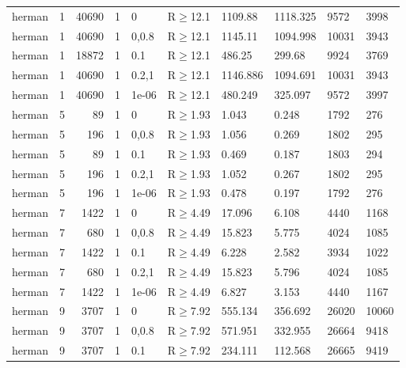 \begin{longtable}{llrrllllll}
 herman        & 1         &  	40690 &   1 & 0     & R$\geq$12.1  & 1109.88  & 1118.325 & 9572    & 3998   \\
 herman        & 1         &  	40690 &   1 & 0,0.8 & R$\geq$12.1  & 1145.11  & 1094.998 & 10031   & 3943   \\
 herman        & 1         &  	18872 &   1 & 0.1   & R$\geq$12.1  & 486.25   & 299.68   & 9924    & 3769   \\
 herman        & 1         &  	40690 &   1 & 0.2,1 & R$\geq$12.1  & 1146.886 & 1094.691 & 10031   & 3943   \\
 herman        & 1         &  	40690 &   1 & 1e-06 & R$\geq$12.1  & 480.249  & 325.097  & 9572    & 3997   \\
 herman        & 5         &     	89 &   1 & 0     & R$\geq$1.93  & 1.043    & 0.248    & 1792    & 276    \\
 herman        & 5         &    	196 &   1 & 0,0.8 & R$\geq$1.93  & 1.056    & 0.269    & 1802    & 295    \\
 herman        & 5         &     	89 &   1 & 0.1   & R$\geq$1.93  & 0.469    & 0.187    & 1803    & 294    \\
 herman        & 5         &    	196 &   1 & 0.2,1 & R$\geq$1.93  & 1.052    & 0.267    & 1802    & 295    \\
 herman        & 5         &    	196 &   1 & 1e-06 & R$\geq$1.93  & 0.478    & 0.197    & 1792    & 276    \\
 herman        & 7         &   	1422 &   1 & 0     & R$\geq$4.49  & 17.096   & 6.108    & 4440    & 1168   \\
 herman        & 7         &    	680 &   1 & 0,0.8 & R$\geq$4.49  & 15.823   & 5.775    & 4024    & 1085   \\
 herman        & 7         &   	1422 &   1 & 0.1   & R$\geq$4.49  & 6.228    & 2.582    & 3934    & 1022   \\
 herman        & 7         &    	680 &   1 & 0.2,1 & R$\geq$4.49  & 15.823   & 5.796    & 4024    & 1085   \\
 herman        & 7         &   	1422 &   1 & 1e-06 & R$\geq$4.49  & 6.827    & 3.153    & 4440    & 1167   \\
 herman        & 9         &   	3707 &   1 & 0     & R$\geq$7.92  & 555.134  & 356.692  & 26020   & 10060  \\
 herman        & 9         &   	3707 &   1 & 0,0.8 & R$\geq$7.92  & 571.951  & 332.955  & 26664   & 9418   \\
 herman        & 9         &   	3707 &   1 & 0.1   & R$\geq$7.92  & 234.111  & 112.568  & 26665   & 9419   \\

\end{longtable}
